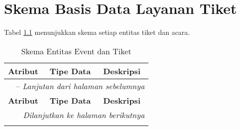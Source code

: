 \chapter{Skema Basis Data Layanan Tiket}
\label{apx:ticket-schema}

Tabel \ref{table:ticket-event-schema} menunjukkan skema setiap entitas tiket dan acara.

\begingroup
\footnotesize
\begin{longtable}{|l|p{}|p{}|}
	\caption{Skema Entitas Event dan Tiket}        
	\label{table:ticket-event-schema}                                                                                     \\
	\hline
	\textbf{Atribut}     & \textbf{Tipe Data}    & \textbf{Deskripsi}                                                                   \\
	\endfirsthead

	\multicolumn{3}{|l|}{\tablename\ \thetable\ -- \textit{Lanjutan dari halaman sebelumnya}}                                           \\
	\hline
	\textbf{Atribut}     & \textbf{Tipe Data}    & \textbf{Deskripsi}                                                                   \\
	\endhead

	\hline
	\multicolumn{3}{|r|}{\textit{Dilanjutkan ke halaman berikutnya}}                                                                    \\
	\endfoot

	\hline
	\endlastfoot


\end{longtable}
